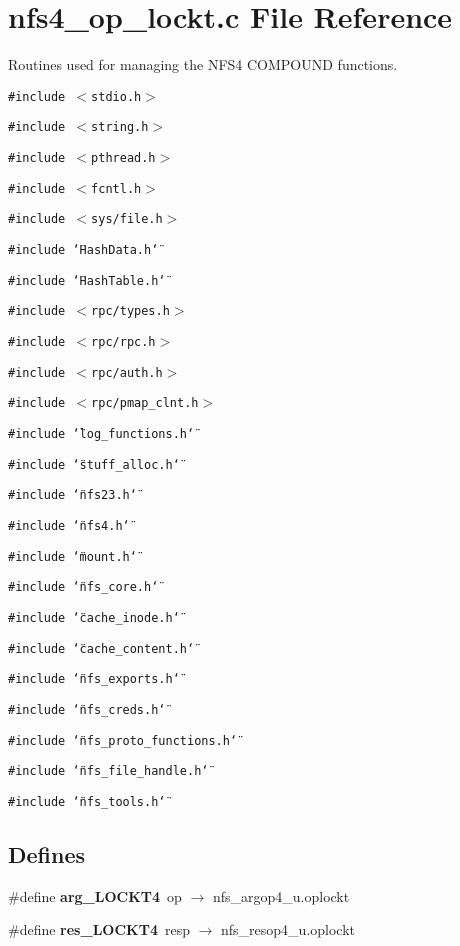 \section{nfs4\_\-op\_\-lockt.c File Reference}
\label{nfs4__op__lockt_8c}
Routines used for managing the NFS4 COMPOUND functions. 

{\tt \#include $<$stdio.h$>$}\par
{\tt \#include $<$string.h$>$}\par
{\tt \#include $<$pthread.h$>$}\par
{\tt \#include $<$fcntl.h$>$}\par
{\tt \#include $<$sys/file.h$>$}\par
{\tt \#include \char`\"{}Hash\-Data.h\char`\"{}}\par
{\tt \#include \char`\"{}Hash\-Table.h\char`\"{}}\par
{\tt \#include $<$rpc/types.h$>$}\par
{\tt \#include $<$rpc/rpc.h$>$}\par
{\tt \#include $<$rpc/auth.h$>$}\par
{\tt \#include $<$rpc/pmap\_\-clnt.h$>$}\par
{\tt \#include \char`\"{}log\_\-functions.h\char`\"{}}\par
{\tt \#include \char`\"{}stuff\_\-alloc.h\char`\"{}}\par
{\tt \#include \char`\"{}nfs23.h\char`\"{}}\par
{\tt \#include \char`\"{}nfs4.h\char`\"{}}\par
{\tt \#include \char`\"{}mount.h\char`\"{}}\par
{\tt \#include \char`\"{}nfs\_\-core.h\char`\"{}}\par
{\tt \#include \char`\"{}cache\_\-inode.h\char`\"{}}\par
{\tt \#include \char`\"{}cache\_\-content.h\char`\"{}}\par
{\tt \#include \char`\"{}nfs\_\-exports.h\char`\"{}}\par
{\tt \#include \char`\"{}nfs\_\-creds.h\char`\"{}}\par
{\tt \#include \char`\"{}nfs\_\-proto\_\-functions.h\char`\"{}}\par
{\tt \#include \char`\"{}nfs\_\-file\_\-handle.h\char`\"{}}\par
{\tt \#include \char`\"{}nfs\_\-tools.h\char`\"{}}\par
\subsection*{Defines}
\begin{CompactItemize}
\item 
\#define {\bf arg\_\-LOCKT4}\ op $\rightarrow$ nfs\_\-argop4\_\-u.oplockt
\item 
\#define {\bf res\_\-LOCKT4}\ resp $\rightarrow$ nfs\_\-resop4\_\-u.oplockt
\end{CompactItemize}
